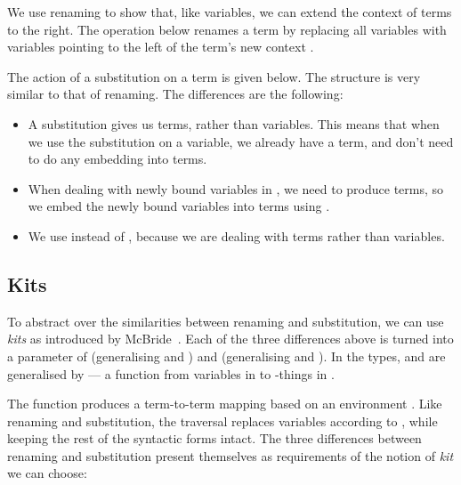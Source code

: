 \bindRen{}
\rename{}

We use renaming to show that, like variables, we can extend the context of terms
to the right.
The operation below renames a term by replacing all variables with variables
pointing to the left of the term's new context \GD{}.

\leftTerm{}

The action of a substitution on a term is given below.
The structure is very similar to that of renaming.
The differences are the following:

\begin{itemize}
  \item A substitution gives us terms, rather than variables.
        This means that when we use the substitution on a variable, we already
        have a term, and don't need to do any embedding into terms.
  \item When dealing with newly bound variables in , we
        need to produce terms, so we embed the newly bound variables into terms
        using .
  \item We use  instead of , because we
        are dealing with terms rather than variables.
\end{itemize}

\bindSub{}
\substitute{}

\subsection{Kits}

To abstract over the similarities between renaming and substitution, we can use
\emph{kits} as introduced by McBride~\cite{McBride05,BHKM12}.
Each of the three differences above is turned into a parameter of
 (generalising  and )
and  (generalising  and
).
In the types,  and  are generalised by
\AgdaSpace{} --- a function from variables in
\AgdaBound{$\Delta$} to -things in \AgdaBound{$\Gamma$}.

\Env{}

The function  produces a term-to-term mapping based on an
environment \AgdaBound{$\rho$}.
Like renaming and substitution, the traversal  replaces
variables according to \AgdaBound{$\rho$}, while keeping the rest of the
syntactic forms intact.
The three differences between renaming and substitution present themselves as
requirements of the notion of \emph{kit} we can choose:

